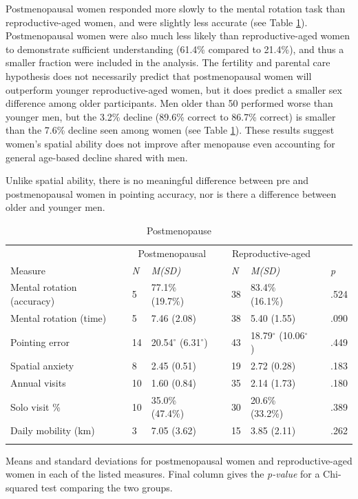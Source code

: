 Postmenopausal women responded more slowly to the mental rotation task than reproductive-aged women, and were slightly less accurate (see Table \ref{tab:meno}).  Postmenopausal women were also much less likely than reproductive-aged women to demonstrate sufficient understanding (61.4\% compared to 21.4\%), and thus a smaller fraction were included in the analysis.  The fertility and parental care hypothesis does not necessarily predict that postmenopausal women will outperform younger reproductive-aged women, but it does predict a smaller sex difference among older participants.  Men older than 50 performed worse than younger men, but the 3.2\% decline (89.6\% correct to 86.7\% correct) is smaller than the 7.6\% decline seen among women (see Table \ref{tab:meno}).  These results suggest women's spatial ability does not improve after menopause even accounting for general age-based decline shared with men.  

Unlike spatial ability, there is no meaningful difference between pre and postmenopausal women in pointing accuracy, nor is there a difference between older and younger men.

\begin{table}[h!]
\caption{Postmenopause}
\label{tab:meno}  
\begin{tabular}{llllllll}
\hline\noalign{\smallskip}
& \multicolumn{2}{c}{Postmenopausal} && \multicolumn{2}{c}{Reproductive-aged} && \\
Measure & \emph{N} & \emph{M(SD)} && \emph{N} & \emph{M(SD)} && \emph{p} \\
\noalign{\smallskip}\hline\noalign{\smallskip}
Mental rotation (accuracy) & 5 & 77.1\% (19.7\%) && 38 & 83.4\% (16.1\%) && .524 \\
Mental rotation (time) & 5 & 7.46 (2.08) && 38 & 5.40 (1.55) && .090 \\
Pointing error & 14 & 20.54$^{\circ}$ (6.31$^{\circ}$) && 43 & 18.79$^{\circ}$ (10.06$^{\circ}$) && .449 \\
Spatial anxiety & 8 & 2.45 (0.51) && 19 & 2.72 (0.28) && .183 \\
Annual visits & 10 & 1.60 (0.84) && 35 & 2.14 (1.73) && .180 \\
Solo visit \% & 10 & 35.0\% (47.4\%) && 30 & 20.6\% (33.2\%) && .389 \\
Daily mobility (km) & 3 & 7.05 (3.62) && 15 & 3.85 (2.11) && .262 \\
\noalign{\smallskip}\hline
\end{tabular}\par
\bigskip
Means and standard deviations for postmenopausal women and reproductive-aged women in each of the listed measures. Final column gives the \emph{p-value} for a Chi-squared test comparing the two groups. \end{table}	

